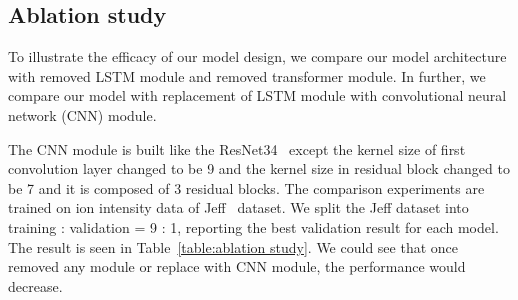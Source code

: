 \subsection{Ablation study}
To illustrate the efficacy of our model design, we compare our model architecture with removed LSTM module and removed transformer module. In further, we compare our model with replacement of LSTM module with convolutional neural network (CNN) module.

The CNN module is built like the ResNet34~\cite{he2015deep} except the kernel size of first convolution layer changed to be 9 and the kernel size in residual block changed to be 7 and it is composed of 3 residual blocks.
The comparison experiments are trained on ion intensity data of Jeff~\cite{liu2018vivo} dataset. We split the Jeff dataset into training : validation = 9 : 1, reporting the best validation result for each model. The result is seen in Table~\ref{table:ablation study}. We could see that once removed any module or replace with CNN module, the performance would decrease. 
